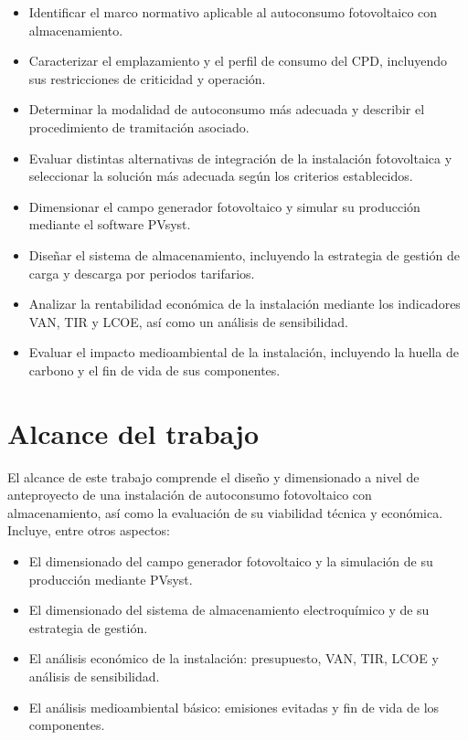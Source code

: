 \begin{itemize}
    \item Identificar el marco normativo aplicable al autoconsumo fotovoltaico con almacenamiento.
    \item Caracterizar el emplazamiento y el perfil de consumo del \ac{CPD}, incluyendo sus restricciones de criticidad y operación.
    \item Determinar la modalidad de autoconsumo más adecuada y describir el procedimiento de tramitación asociado.
    \item Evaluar distintas alternativas de integración de la instalación fotovoltaica y seleccionar la solución más adecuada según los criterios establecidos.
    \item Dimensionar el campo generador fotovoltaico y simular su producción mediante el software PVsyst.
    \item Diseñar el sistema de almacenamiento, incluyendo la estrategia de gestión de carga y descarga por periodos tarifarios.
    \item Analizar la rentabilidad económica de la instalación mediante los indicadores \ac{VAN}, \ac{TIR} y \ac{LCOE}, así como un análisis de sensibilidad.
    \item Evaluar el impacto medioambiental de la instalación, incluyendo la huella de carbono y el fin de vida de sus componentes.
\end{itemize}

\section{Alcance del trabajo}
\label{sec:intro-alcance}

El alcance de este trabajo comprende el diseño y dimensionado a nivel de anteproyecto de una instalación de autoconsumo fotovoltaico con almacenamiento, así como la evaluación de su viabilidad técnica y económica. Incluye, entre otros aspectos:

\begin{itemize}
    \item El dimensionado del campo generador fotovoltaico y la simulación de su producción mediante PVsyst.
    \item El dimensionado del sistema de almacenamiento electroquímico y de su estrategia de gestión.
    \item El análisis económico de la instalación: presupuesto, \ac{VAN}, \ac{TIR}, \ac{LCOE} y análisis de sensibilidad.
    \item El análisis medioambiental básico: emisiones evitadas y fin de vida de los componentes.
\end{itemize}

